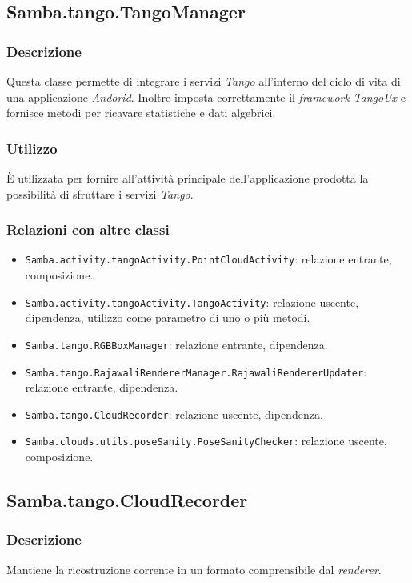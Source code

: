 \subsection{Samba.tango.TangoManager}
\subsubsection{Descrizione}
Questa classe permette di integrare i servizi \emph{Tango} all'interno del ciclo di vita di una applicazione \emph{Andorid}. Inoltre imposta correttamente il \emph{framework} \emph{TangoUx} e fornisce metodi per ricavare statistiche e dati algebrici.
\subsubsection{Utilizzo}
È utilizzata per fornire all'attività principale dell'applicazione prodotta la possibilità di sfruttare i servizi \emph{Tango}.
\subsubsection{Relazioni con altre classi}
\begin{itemize}
	\item \texttt{Samba.activity.tangoActivity.PointCloudActivity}: relazione entrante, composizione.
	\item \texttt{Samba.activity.tangoActivity.TangoActivity}: relazione uscente, dipendenza, utilizzo come parametro di uno o più metodi.
	\item \texttt{Samba.tango.RGBBoxManager}: relazione entrante, dipendenza.
	\item \texttt{Samba.tango.RajawaliRendererManager.RajawaliRendererUpdater}: relazione entrante, dipendenza.
	\item \texttt{Samba.tango.CloudRecorder}: relazione uscente, dipendenza.
	\item \texttt{Samba.clouds.utils.poseSanity.PoseSanityChecker}: relazione uscente, composizione.
\end{itemize}

\subsection{Samba.tango.CloudRecorder}
\subsubsection{Descrizione}
Mantiene la ricostruzione corrente in un formato comprensibile dal \emph{renderer}.
